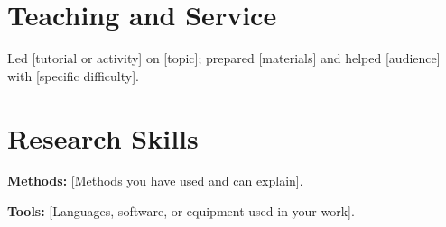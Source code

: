 \documentclass{resume}
\begin{document}
\section{Teaching and Service}

\begin{jobduties}
  \item Led [tutorial or activity] on [topic]; prepared [materials] and helped [audience] with [specific difficulty].
\end{jobduties}


\section{Research Skills}

\begin{skillitems}
  \item \textbf{Methods:} [Methods you have used and can explain].
  \item \textbf{Tools:} [Languages, software, or equipment used in your work].
\end{skillitems}
\end{document}
